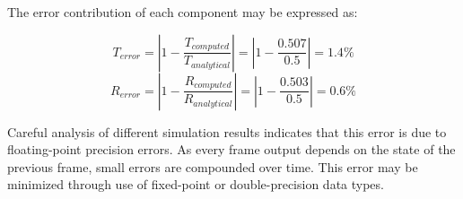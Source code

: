 The error contribution of each component may be expressed as:

\begin{equation}
T_{error} = |1 - \frac{T_{computed}}{T_{analytical}}| = |1 - \frac{0.507}{0.5}| = 1.4\%
\end{equation}
\begin{equation}
R_{error} = |1 - \frac{R_{computed}}{R_{analytical}}| = |1 - \frac{0.503}{0.5}| = 0.6\%
\end{equation}

Careful analysis of different simulation results indicates that this error is due to floating-point precision errors. As every frame output depends on the state of the previous frame, small errors are compounded over time. This error may be minimized through use of fixed-point or double-precision data types. 




